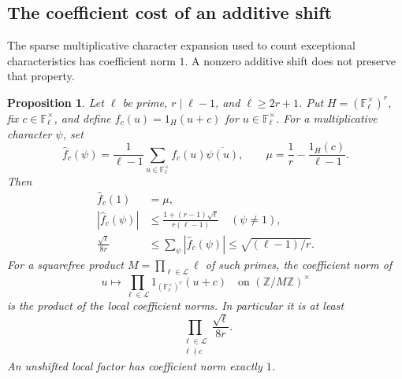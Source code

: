 \documentclass[11pt]{article}
\newtheorem{proposition}[theorem]{Proposition}
\theoremstyle{definition}
\theoremstyle{remark}
\begin{document}
\subsection{The coefficient cost of an additive shift}

The sparse multiplicative character expansion used to count exceptional
characteristics has coefficient norm \(1\). A nonzero additive shift
does not preserve that property.

\begin{proposition}\label{prop:shift-fourier-cost}
Let \(\ell\) be prime, \(r\mid\ell-1\), and \(\ell\geq2r+1\).
Put \(H=(\mathbb F_\ell^\times)^r\), fix \(c\in\mathbb F_\ell^\times\),
and define \(f_c(u)=1_H(u+c)\) for \(u\in\mathbb F_\ell^\times\).
For a multiplicative character \(\psi\), set
\[
 \widehat f_c(\psi)=
 \frac1{\ell-1}\sum_{u\in\mathbb F_\ell^\times}
 f_c(u)\overline{\psi(u)},\qquad
 \mu=\frac1r-\frac{1_H(c)}{\ell-1}.
\]
Then
\begin{align*}
 \widehat f_c(1)&=\mu,\\
 |\widehat f_c(\psi)|
 &\leq\frac{1+(r-1)\sqrt\ell}{r(\ell-1)}
 \quad(\psi\ne1),\\
 \frac{\sqrt\ell}{8r}
 &\leq \sum_\psi|\widehat f_c(\psi)|
 \leq \sqrt{(\ell-1)/r}.
\end{align*}
For a squarefree product \(M=\prod_{\ell\in\mathcal L}\ell\)
of such primes, the coefficient norm of
\[
 u\longmapsto
 \prod_{\ell\in\mathcal L}1_{(\mathbb F_\ell^\times)^r}(u+c)
 \quad\text{on }(\mathbb Z/M\mathbb Z)^\times
\]
is the product of the local coefficient norms. In particular it is
at least
\[
 \prod_{\substack{\ell\in\mathcal L\\\ell\nmid c}}
 \frac{\sqrt\ell}{8r}.
\]
An unshifted local factor has coefficient norm exactly \(1\).
\end{proposition}
\end{document}
